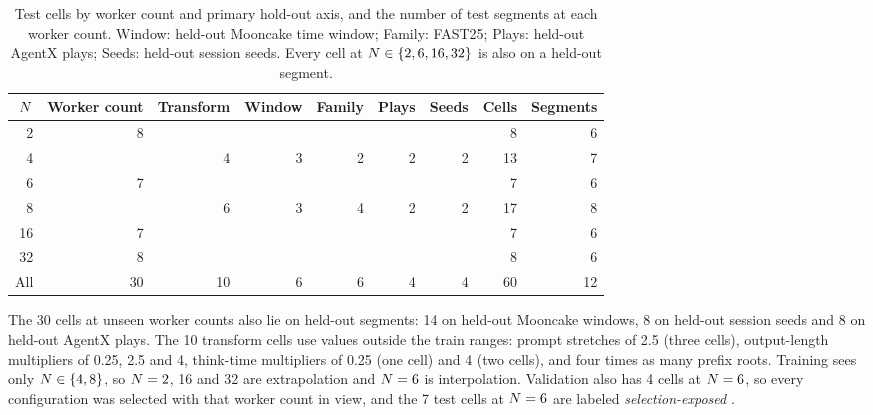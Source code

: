 \begin{table}[tbp]
  \centering\small
  \caption{Test cells by worker count and primary hold-out axis, and the number of test segments
    at each worker count. Window: held-out Mooncake time window; Family: FAST25; Plays: held-out
    AgentX plays; Seeds: held-out session seeds. Every cell at $N \in \{2, 6, 16, 32\}$ is also on
    a held-out segment.}
  \label{tab:test-axes}
  \begin{tabular}{@{}rrrrrrrrr@{}}
    \toprule
    $N$ & Worker count & Transform & Window & Family & Plays & Seeds & Cells & Segments \\
    \midrule
    2  & 8  &   &   &   &   &   & 8  & 6 \\
    4  &    & 4 & 3 & 2 & 2 & 2 & 13 & 7 \\
    6  & 7  &   &   &   &   &   & 7  & 6 \\
    8  &    & 6 & 3 & 4 & 2 & 2 & 17 & 8 \\
    16 & 7  &   &   &   &   &   & 7  & 6 \\
    32 & 8  &   &   &   &   &   & 8  & 6 \\
    \midrule
    All & 30 & 10 & 6 & 6 & 4 & 4 & 60 & 12 \\
    \bottomrule
  \end{tabular}
\end{table}

The 30 cells at unseen worker counts also lie on held-out segments: 14 on held-out Mooncake
windows, 8 on held-out session seeds and 8 on held-out AgentX plays. The 10 transform cells use
values outside the train ranges: prompt stretches of 2.5 (three cells), output-length multipliers
of 0.25, 2.5 and 4, think-time multipliers of 0.25 (one cell) and 4 (two cells), and four times as
many prefix roots. Training sees only $N \in \{4, 8\}$, so $N = 2$, 16 and 32 are
extrapolation and $N = 6$ is interpolation. Validation also has 4 cells at $N = 6$, so every
configuration was selected with that worker count in view, and the 7 test cells at $N = 6$ are
labeled \emph{selection-exposed} \citep{cawley2010overfitting}.

